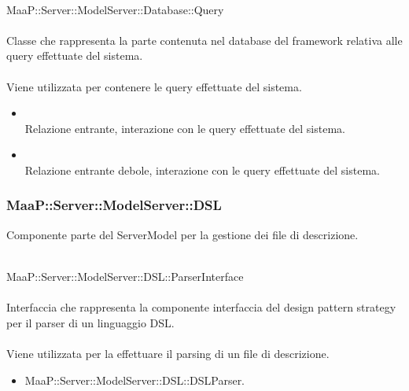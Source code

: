 	\\
	MaaP::Server::ModelServer::Database::Query\\
	\\
	Classe che rappresenta la parte contenuta nel database del framework relativa alle query effettuate del sistema.\\
	\\
	Viene utilizzata per contenere le query effettuate del sistema.\\
	\begin{itemize}
	\item{}\\
	Relazione entrante, interazione con le query effettuate del sistema.
	\item{}\\
	Relazione entrante debole, interazione con le query effettuate del sistema.
	\end{itemize}
	

\subsubsection{MaaP::Server::ModelServer::DSL}
Componente parte del ServerModel per la gestione dei file di descrizione.

	\\
	MaaP::Server::ModelServer::DSL::ParserInterface\\
	\\
	Interfaccia che rappresenta la componente interfaccia del design pattern strategy per il parser di un linguaggio DSL.\\
	\\
	Viene utilizzata per la effettuare il parsing di un file di descrizione.\\
	\begin{itemize}
	\item MaaP::Server::ModelServer::DSL::DSLParser.
	\end{itemize}
		
